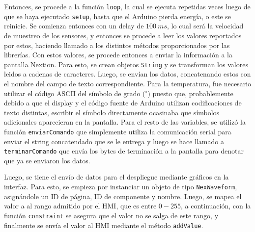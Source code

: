 Entonces, se procede a la función \texttt{loop}, la cual se ejecuta repetidas
veces luego de que se haya ejecutado \texttt{setup}, hasta que el Arduino
pierda energía, o este se reinicie. Se comienza entonces con un delay de $100\
\unit{ms}$, lo cual será la velocidad de muestreo de los sensores, y entonces
se procede a leer los valores reportados por estos, haciendo llamado a los
distintos métodos proporcionados por las librerías. Con estos valores, se
procede entonces a enviar la información a la pantalla Nextion. Para esto, se
crean objetos \texttt{String} y se transforman los valores leidos a cadenas de
caracteres. Luego, se envían los datos, concatenando estos con el nombre del
campo de texto correspondiente. Para la temperatura, fue necesario utilizar el
código ASCII del símbolo de grado ($^{\circ}$) puesto que, probablemente debido
a que el display y el código fuente de Arduino utilizan codificaciones de texto
distintas, escribir el símbolo directamente ocasinaba que símbolos adicionales
aparecieran en la pantalla. Para el resto de las variables, se utilizó la
función \texttt{enviarComando} que simplemente utiliza la comunicación serial
para enviar el string concatendado que se le entrega y luego se hace llamado
a \texttt{terminarComando} que envía los bytes de terminación a la pantalla
para denotar que ya se enviaron los datos.

Luego, se tiene el envío de datos para el despliegue mediante gráficos en
la interfaz. Para esto, se empieza por instanciar un objeto de tipo
\texttt{NexWaveform}, asignándole un ID de página, ID de componente y
nombre. Luego, se mapea el valor a al rango admitido por el HMI, que
es entre $0-255$, a continuación, con la función \texttt{constraint} se
asegura que el valor no se salga de este rango, y finalmente se envía el
valor al HMI mediante el método \texttt{addValue}.
